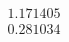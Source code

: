 \documentclass[preview]{standalone}
\begin{document}
\begin{align*}
1.171405 \\ 0.281034
\end{align*}
\end{document}
